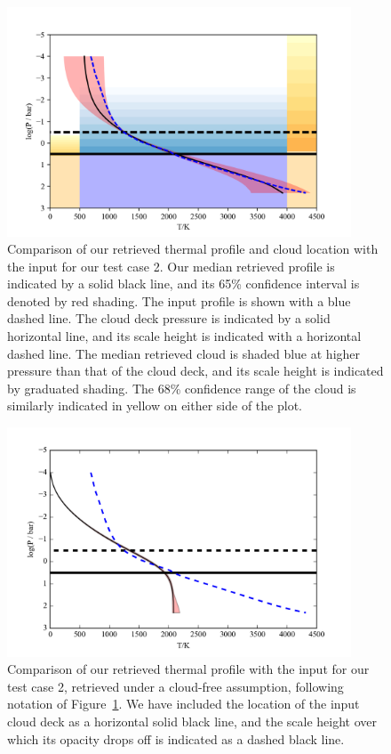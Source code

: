 \documentclass[useAMS,usenatbib]{mn2e}
\begin{document}
\begin{figure}
\hspace{-0.8cm}\includegraphics[width=290pt]{TestBD_Case2_prof_1sigma.png}
\caption{Comparison of our retrieved thermal profile and cloud location with the input for our test case 2. Our median retrieved profile is indicated by a solid black line, and its 65\% confidence interval is denoted by red shading. The input profile is shown with a blue dashed line. The cloud deck pressure is indicated by a solid horizontal line, and its scale height is indicated with a horizontal dashed line. The median retrieved cloud is shaded blue at higher pressure than that of the cloud deck, and its scale height is indicated by graduated shading. The 68\% confidence range of the cloud is similarly indicated in yellow on either side of the plot.
\label{fig:test2_cld}}
\end{figure}


\begin{figure}
\hspace{-0.8cm}\includegraphics[width=290pt]{TestBD_Case2_OFF_prof_1sigma.png}
\caption{Comparison of our retrieved thermal profile with the input for our test case 2, retrieved under a cloud-free assumption, following notation of Figure~\ref{fig:test2_cld}.  We have included the location of the input cloud deck as a horizontal solid black line, and the scale height over which its opacity drops off is indicated as a dashed black line.
\label{fig:test2_nc}}
\end{figure}
\end{document}
